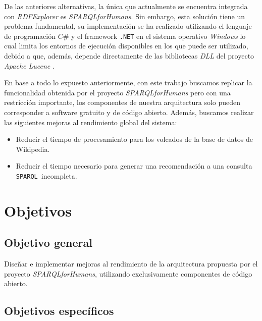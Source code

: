 \documentclass[conference,compsoc]{IEEEtran}
\newcommand{\spql}{\texttt{SPARQL}\ }
\begin{document}
De las anteriores alternativas, la única que actualmente se encuentra integrada con \textit{RDFExplorer}
es \textit{SPARQLforHumans}. Sin embargo, esta solución tiene un problema fundamental, su implementación
se ha realizado utilizando el lenguaje de programación $C\#$ y el framework \texttt{.NET} en el sistema
operativo \textit{Windows} lo cual limita los entornos de ejecución disponibles en los que puede ser utilizado,
debido a que, además, depende directamente de las bibliotecas \textit{DLL} del proyecto \textit{Apache Lucene}
\cite{bialecki2012apache}.


En base a todo lo expuesto anteriormente, con este trabajo buscamos replicar la funcionalidad obtenida por
el proyecto \textit{SPARQLforHumans} pero con una restricción importante, los componentes de nuestra arquitectura
solo pueden corresponder a software gratuito y de código abierto. Además, buscamos realizar las siguientes mejoras
al rendimiento global del sistema:

\begin{itemize}
    \item Reducir el tiempo de procesamiento para los volcados de la base de datos de Wikipedia.
    \item Reducir el tiempo necesario para generar una recomendación a una consulta \spql incompleta.
\end{itemize}

\section{Objetivos}

    \subsection{Objetivo general}

Diseñar e implementar mejoras al rendimiento de la arquitectura propuesta por el proyecto
\textit{SPARQLforHumans}, utilizando exclusivamente componentes de código abierto.

    \subsection{Objetivos específicos}
\end{document}
